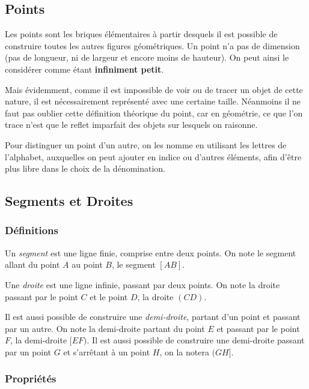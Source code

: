 \documentclass[a4paper, twoside]{article}
\begin{document}
\subsection{Points}

Les points sont les briques élémentaires à partir desquels il est possible de construire toutes les autres figures géométriques.
Un point n'a pas de dimension (pas de longueur, ni de largeur et encore moins de hauteur).
On peut ainsi le considérer comme étant \textbf{infiniment petit}.

Mais évidemment, comme il est impossible de voir ou de tracer un objet de cette nature,
il est nécessairement représenté avec une certaine taille. Néanmoins il ne faut pas oublier cette définition théorique du point,
car en géométrie, ce que l'on trace n'est que le reflet imparfait des objets sur lesquels on raisonne.

\medbreak

Pour distinguer un point d'un autre, on les nomme en utilisant les lettres de l'alphabet,
auxquelles on peut ajouter en indice ou d'autres éléments,
afin d'être plus libre dans le choix de la dénomination.

\newpage

\subsection{Segments et Droites}

\subsubsection*{Définitions}

Un \emph{segment} est une ligne finie, comprise entre deux points.
On note le segment allant du point $A$ au point $B$, le segment $[AB]$.

\medbreak

Une \emph{droite} est une ligne infinie, passant par deux points.
On note la droite passant par le point $C$ et le point $D$, la droite $(CD)$.

\medbreak

Il est aussi possible de construire une \emph{demi-droite}, partant d'un point et passant par un autre.
On note la demi-droite partant du point $E$ et passant par le point $F$, la demi-droite $[EF)$.
				Il est aussi possible de construire une demi-droite passant par un point $G$ et s'arrêtant à un point $H$,
				on la notera $(GH]$.

\subsubsection*{Propriétés}
\end{document}
